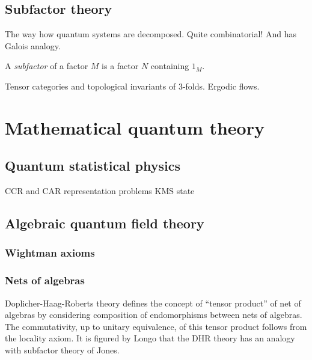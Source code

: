 \documentclass[a4paper]{report}
\begin{document}
\begin{prb}

\end{prb}








\chapter{Subfactor theory}
The way how quantum systems are decomposed.
Quite combinatorial!
And has Galois analogy.

\begin{prb}
A \emph{subfactor} of a factor $M$ is a factor $N$ containing $1_M$.
\end{prb}

Tensor categories and topological invariants of 3-folds.
Ergodic flows.







\part{Mathematical quantum theory}

\chapter{Quantum statistical physics}
CCR and CAR representation problems
KMS state




\chapter{Algebraic quantum field theory}
\section{Wightman axioms}
\section{Nets of algebras}
Doplicher-Haag-Roberts theory defines the concept of ``tensor product'' of net of algebras by considering composition of endomorphisms between nets of algebras.
The commutativity, up to unitary equivalence, of this tensor product follows from the locality axiom.
It is figured by Longo that the DHR theory has an analogy with subfactor theory of Jones.
\end{document}
